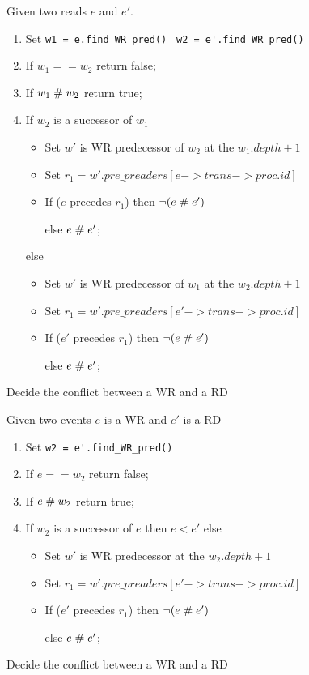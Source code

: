 \documentclass{llncs}
\begin{document}
\begin{algorithm}
Given two reads $e$ and $e'$.
\begin{enumerate}
	\item
		Set \verb!w1 = e.find_WR_pred() !
			\verb!w2 = e'.find_WR_pred()!
	\item
		If $w_1 == w_2$
			return false;
	\item
		If $w_1 \mathrel{\#} w_2$
			return true;
	\item
		If $w_2$ is a successor of $w_1$
		\begin{itemize}
			\item
				Set $w'$ is WR predecessor of $w_2$ at the $w_1.depth + 1$
			\item
				Set $r_1 = w'.pre\_preaders[e->trans->proc.id]$
			\item
				If ($e$ precedes $r_1$) then $\lnot (e \mathrel{\#} e')$
				
				else 	$e \mathrel{\#} e'$;
		\end{itemize}
		else
		\begin{itemize}
			\item
				Set $w'$ is WR predecessor of $w_1$ at the $w_2.depth + 1$
			\item
				Set $r_1 = w'.pre\_preaders[e'->trans->proc.id]$
			\item
				If ($e'$ precedes $r_1$) then $\lnot (e \mathrel{\#} e')$
				
				else 	$e \mathrel{\#} e'$;
		\end{itemize}
		
\end{enumerate}
\caption{Decide the conflict between a WR and a RD}
\label{a:reads}	
\end{algorithm}

\begin{algorithm}
Given two events $e$ is a WR and $e'$ is a RD
\begin{enumerate}
	\item
		Set 	\verb!w2 = e'.find_WR_pred()!
	\item
		If $e == w_2$
			return false;
	\item
		If $e \mathrel{\#} w_2$
			return true;
	\item
		If $w_2$ is a successor of $e$
		then $e < e'$
		else
		\begin{itemize}
			\item
				Set $w'$ is WR predecessor at the $w_2.depth + 1$
			\item
				Set $r_1 = w'.pre\_preaders[e'->trans->proc.id]$
			\item
				If ($e'$ precedes $r_1$) then $\lnot (e \mathrel{\#} e')$
				
				else 	$e \mathrel{\#} e'$;
		\end{itemize}
		
\end{enumerate}
\caption{Decide the conflict between a WR and a RD}
\label{a:reads}	
\end{algorithm}
\end{document}
